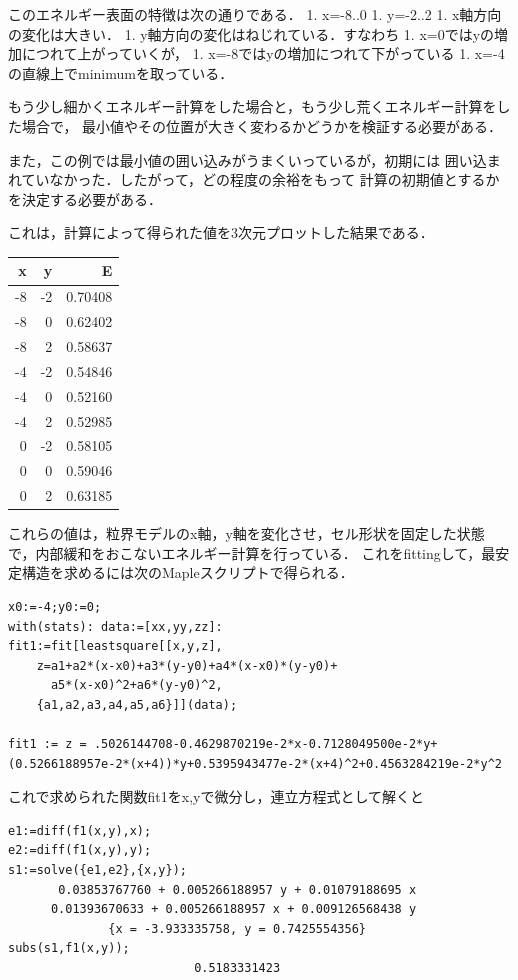 \documentclass[11pt,dvipdfmx]{jsarticle}
\begin{document}
    このエネルギー表面の特徴は次の通りである． 1. x=-8..0 1. y=-2..2 1.
x軸方向の変化は大きい． 1. y軸方向の変化はねじれている．すなわち 1.
x=0ではyの増加につれて上がっていくが， 1.
x=-8ではyの増加につれて下がっている 1.
x=-4の直線上でminimumを取っている．

もう少し細かくエネルギー計算をした場合と，もう少し荒くエネルギー計算をした場合で，
最小値やその位置が大きく変わるかどうかを検証する必要がある．

また，この例では最小値の囲い込みがうまくいっているが，初期には
囲い込まれていなかった．したがって，どの程度の余裕をもって
計算の初期値とするかを決定する必要がある．

    これは，計算によって得られた値を3次元プロットした結果である．

\begin{longtable}[]{@{}rrr@{}}
\toprule
x & y & E\tabularnewline
\midrule
\endhead
-8 & -2 & 0.70408\tabularnewline
-8 & 0 & 0.62402\tabularnewline
-8 & 2 & 0.58637\tabularnewline
-4 & -2 & 0.54846\tabularnewline
-4 & 0 & 0.52160\tabularnewline
-4 & 2 & 0.52985\tabularnewline
0 & -2 & 0.58105\tabularnewline
0 & 0 & 0.59046\tabularnewline
0 & 2 & 0.63185\tabularnewline
\bottomrule
\end{longtable}

これらの値は，粒界モデルのx軸，y軸を変化させ，セル形状を固定した状態で，内部緩和をおこないエネルギー計算を行っている．
これをfittingして，最安定構造を求めるには次のMapleスクリプトで得られる．

\begin{verbatim}
x0:=-4;y0:=0;
with(stats): data:=[xx,yy,zz]: 
fit1:=fit[leastsquare[[x,y,z], 
    z=a1+a2*(x-x0)+a3*(y-y0)+a4*(x-x0)*(y-y0)+
      a5*(x-x0)^2+a6*(y-y0)^2, 
    {a1,a2,a3,a4,a5,a6}]](data);

fit1 := z = .5026144708-0.4629870219e-2*x-0.7128049500e-2*y+
(0.5266188957e-2*(x+4))*y+0.5395943477e-2*(x+4)^2+0.4563284219e-2*y^2
\end{verbatim}

これで求められた関数fit1をx,yで微分し，連立方程式として解くと

\begin{verbatim}
e1:=diff(f1(x,y),x);
e2:=diff(f1(x,y),y);
s1:=solve({e1,e2},{x,y});
       0.03853767760 + 0.005266188957 y + 0.01079188695 x
      0.01393670633 + 0.005266188957 x + 0.009126568438 y
              {x = -3.933335758, y = 0.7425554356}
subs(s1,f1(x,y));
                          0.5183331423
\end{verbatim}
\end{document}
